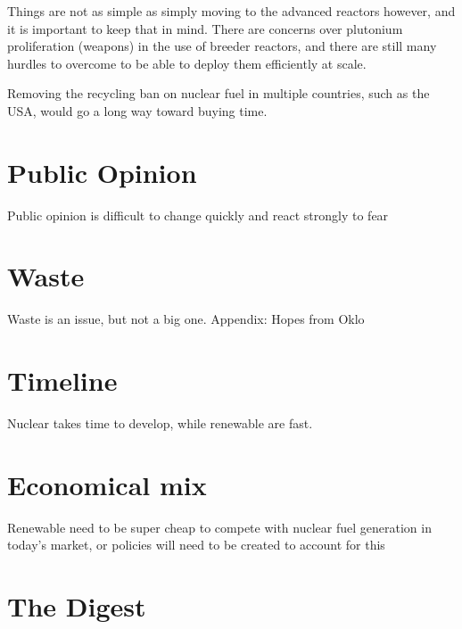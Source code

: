 Things are not as simple as simply moving to the advanced reactors however, and it is important to keep that in mind. There are concerns over plutonium proliferation (weapons) in the use of breeder reactors, and there are still many hurdles to overcome to be able to deploy them efficiently at scale.

Removing the recycling ban on nuclear fuel in multiple countries, such as the USA, would go a long way toward buying time.

\blindtext

\section{Public Opinion}

Public opinion is difficult to change quickly and react strongly to fear

\blindtext

\section{Waste}

Waste is an issue, but not a big one. Appendix: Hopes from Oklo

\blindtext

\section{Timeline}

Nuclear takes time to develop, while renewable are fast.

\blindtext

\section{Economical mix}

Renewable need to be super cheap to compete with nuclear fuel generation in today's market, or policies will need to be created to account for this

\blindtext



\section{The Digest}

